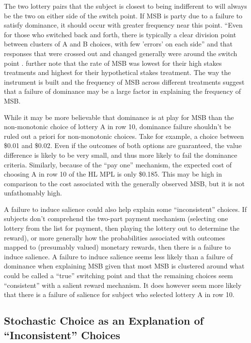 The two lottery pairs that the subject is closest to being indifferent to will always be the two on either side of the switch point.
If MSB is party due to a failure to satisfy dominance, it should occur with greater frequency near this point.
\textcite[1648]{Holt2002} \enquote{Even for those who switched back and forth, there is typically a clear division point between clusters of A and B choices, with few 'errors' on each side} and that responses that were crossed out and changed generally were around the switch point \parencite*[1646]{Holt2002}.
\textcite[1647-1648]{Holt2002} further note that the rate of MSB was lowest for their high stakes treatments and highest for their hypothetical stakes treatment.
The way the instrument is built and the frequency of MSB across different treatments suggest that a failure of dominance may be a large factor in explaining the frequency of MSB.

While it may be more believable that dominance is at play for MSB than the non-monotonic choice of lottery A in row 10, dominance failure shouldn't be ruled out a priori for non-monotonic choices.
Take for example, a choice between \$0.01 and \$0.02.
Even if the outcomes of both options are guaranteed, the value difference is likely to be very small, and thus more likely to fail the dominance criteria.
Similarly, because of the \enquote{pay one} mechanism, the expected cost of choosing A in row 10 of the HL MPL is only \$0.185.
This may be high in comparison to the cost associated with the generally observed MSB, but it is not unfathomably high.

A failure to induce salience could also help explain some \enquote{inconsistent} choices.
If subjects don't comprehend the two-part payment mechanism (selecting one lottery from the list for payment, then playing the lottery out to determine the reward), or more generally how the probabilities associated with outcomes mapped to (presumably valued) monetary rewards, then there is a failure to induce salience.
A failure to induce salience seems less likely than a failure of dominance when explaining MSB given that most MSB is clustered around what could be called a \enquote{true} switching point and that the remaining choices seem \enquote{consistent} with a salient reward mechanism.
It does however seem more likely that there is a failure of salience for subject who selected lottery A in row 10.

\subsection{Stochastic Choice as an Explanation of \enquote{Inconsistent} Choices}

